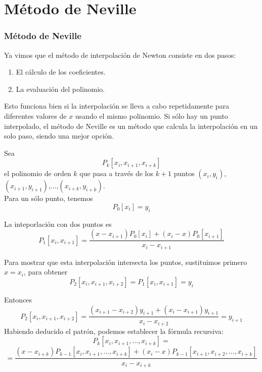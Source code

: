 \section{Método de Neville}
\begin{frame}
\frametitle{Método de Neville}
Ya vimos que el método de interpolación de Newton consiste en dos pasos:
\begin{enumerate}
\item El cálculo de los coeficientes.
\item La evaluación del polinomio.
\end{enumerate}
Esto funciona bien si la interpolación se lleva a cabo repetidamente para diferentes valores de $x$ usando el mismo polinomio. Si sólo hay un punto interpolado, el método de Neville es un método que calcula la interpolación en un solo paso, siendo una mejor opción.
\end{frame}
\begin{frame}
Sea 
\[ P_{k}[x_{i},x_{i+1},x_{i+k}]\]
el polinomio de orden $k$ que pasa a través de los $k+1$ puntos $(x_{i},y_{i})$,$(x_{i+1},y_{i+1})$,$\ldots$,$(x_{i+k},y_{i+k})$.
\\
\bigskip
Para un sólo punto, tenemos
\[ P_{0}[x_{i}] = y_{i}\]
\end{frame}
\begin{frame}
La inteporlación con dos puntos es
\[ P_{1}[x_{i},x_{i+1}] = \dfrac{(x-x_{i+1})P_{0}[x_{i}] + (x_{i}-x)P_{0}[x_{i+1}]}{x_{i}-x_{i+1}} \]
\fontsize{12}{12}\selectfont
{}
\end{frame}
\begin{frame}
Para mostrar que esta interpolación intersecta los puntos, sustituimos primero $x=x_{i}$, para obtener
\[P_{2}[x_{i},x_{i+1},x_{i+2}] = P_{1}[x_{i},x_{i+1}] = y_{i}\]
\end{frame}
\begin{frame}
Entonces
\fontsize{12}{12}\selectfont
\[ P_{2}[x_{i},x_{i+1},x_{i+2}] = \dfrac{(x_{i+1}-x_{i+2})y_{i+1}+(x_{i}-x_{i+1})y_{i+1}}{x_{i}-x_{i+2}} = y_{i+1} \]
\fontsize{14}{14}\selectfont
Habiendo deducido el patrón, podemos establecer la fórmula recursiva:
\fontsize{10}{10}\selectfont
\begin{equation*}
P_{k}[x_{i},x_{i+1},\ldots,x_{i+k}] = 
\end{equation*}
\begin{equation*}
= \dfrac{(x-x_{i+k})P_{k-1}[x_{i},x_{i+1},\ldots,x_{i+k}]+(x_{i}-x)P_{k-1} [x_{i+1},x_{i+2},\ldots,x_{i+k}]}{x_{i}-x_{i+k}}
\end{equation*}
\end{frame}
